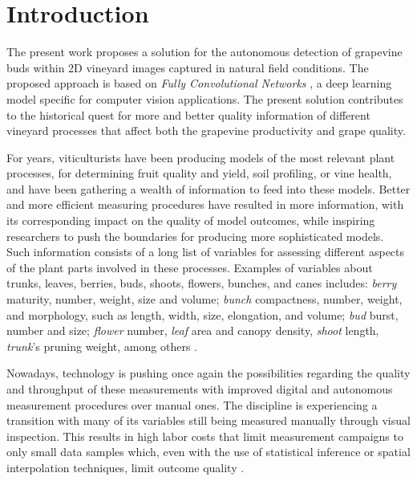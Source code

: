 \documentclass[a4paper,authoryear,review]{elsarticle}
\begin{document}
	\linenumbers
	
	
	
	\section{Introduction}
	
	The present work proposes a solution for the autonomous detection of grapevine buds within 2D vineyard images captured in natural field conditions. The proposed approach is based on \emph{Fully Convolutional Networks} \citep{long2015fully, shelhamer2017fully}, a deep learning model specific for computer vision applications. The present solution contributes to the historical quest for more and better quality information of different vineyard processes that affect both the grapevine productivity and grape quality. 
	
	For years, viticulturists have been producing models of the most relevant plant processes, for determining  fruit quality and yield, soil profiling, or vine health, and have been gathering a wealth of information to feed into these models. Better and more efficient measuring procedures have resulted in more information, with its corresponding impact on the quality of model outcomes, while inspiring researchers to push the boundaries for producing more sophisticated models. Such information consists of a long list of variables for assessing different aspects of the plant parts involved in these processes. Examples of variables about trunks, leaves, berries, buds, shoots, flowers, bunches, and canes includes: \emph{berry} maturity, number, weight, size and volume; \emph{bunch} compactness, number, weight, and morphology, such as length, width, size, elongation, and volume; \emph{bud} burst, number and size; \emph{flower} number, \emph{leaf} area and canopy density, \emph{shoot} length, \emph{trunk}’s pruning weight, among others \citep{awriNDmanual1, awriNDmanual3}.
	
	Nowadays, technology is pushing once again the possibilities regarding the quality and throughput of these measurements with improved digital and autonomous measurement procedures over manual ones. The discipline is experiencing a transition with many of its variables still being measured manually through visual inspection. This results in high labor costs that limit measurement campaigns to only small data samples which, even with the use of statistical inference or spatial interpolation techniques, limit outcome quality \citep{whelan1996spatial}. 
	
\end{document}
